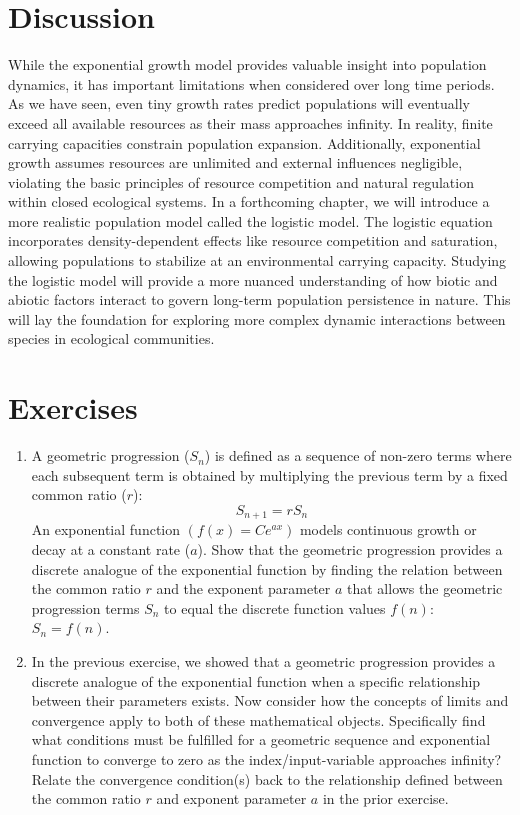 \section{Discussion}

While the exponential growth model provides valuable insight into population dynamics, it has important limitations when considered over long time periods. As we have seen, even tiny growth rates predict populations will eventually exceed all available resources as their mass approaches infinity. In reality, finite carrying capacities constrain population expansion. Additionally, exponential growth assumes resources are unlimited and external influences negligible, violating the basic principles of resource competition and natural regulation within closed ecological systems. In a forthcoming chapter, we will introduce a more realistic population model called the logistic model. The logistic equation incorporates density-dependent effects like resource competition and saturation, allowing populations to stabilize at an environmental carrying capacity. Studying the logistic model will provide a more nuanced understanding of how biotic and abiotic factors interact to govern long-term population persistence in nature. This will lay the foundation for exploring more complex dynamic interactions between species in ecological communities.

\section*{Exercises}

\begin{enumerate}
    \item  A geometric progression ($S_n$) is defined as a sequence of non-zero terms where each subsequent term is obtained by multiplying the previous term by a fixed common ratio ($r$):
    \begin{equation*}
        S_{n+1} = r S_n
    \end{equation*}
    An exponential function $\left(f(x) = C e^{a x}\right)$ models continuous growth or decay at a constant rate ($a$). Show that the geometric progression provides a discrete analogue of the exponential function by finding the relation between the common ratio $r$ and the exponent parameter $a$ that allows the geometric progression terms $S_n$ to equal the discrete function values $f(n)$: $S_n = f(n)$.

    \item In the previous exercise, we showed that a geometric progression provides a discrete analogue of the exponential function when a specific relationship between their parameters exists. Now consider how the concepts of limits and convergence apply to both of these mathematical objects. Specifically find what conditions must be fulfilled for a geometric sequence and exponential function to converge to zero as the index/input-variable approaches infinity? Relate the convergence condition(s) back to the relationship defined between the common ratio $r$ and exponent parameter $a$ in the prior exercise.
\end{enumerate}